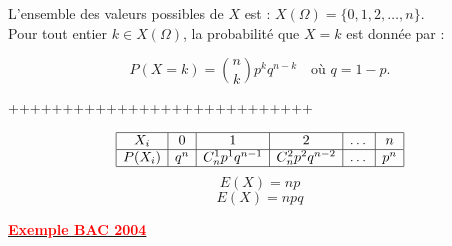 \documentclass[12pt]{article}
\begin{document}
L'ensemble des valeurs possibles de \( X \) est : \( X(\Omega) = \{0, 1, 2, \ldots, n\} \).\\
Pour tout entier \( k \in X(\Omega) \), la probabilité que \( X = k \) est donnée par :

\[
P(X = k) = \binom{n}{k} p^k q^{n-k}
\quad \text{où } q = 1 - p.
\]


++++++++++++++++++++++++++++

\[
\begin{array}{|c|c|c|c|c|c|}
\hline
X_i & 0 & 1 & 2 & \dots & n \\
\hline
P(X_i) & q^n & C_n^1 p^1 q^{n-1} & C_n^2 p^2 q^{n-2} & \dots & p^n \\
\hline
\end{array}
\]
\[
E(X) = n p
\]
\[
E(X) = n pq
\]

\underline{\textbf{\textcolor{red}{Exemple BAC 2004}}}
\end{document}
